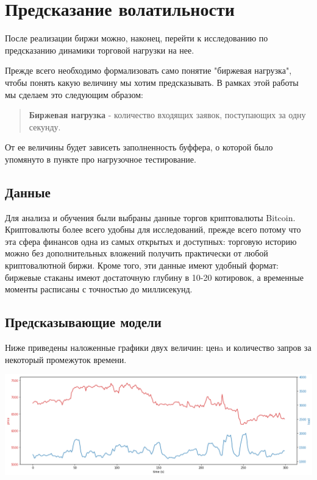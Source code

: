 \section{Предсказание волатильности}
После реализации биржи можно, наконец, перейти к исследованию по предсказанию динамики торговой нагрузки на нее.

Прежде всего необходимо формализовать само понятие "биржевая нагрузка", чтобы понять какую величину мы хотим предсказывать. В рамках этой работы мы сделаем это следующим образом:

\begin{quote}
\textbf{Биржевая нагрузка} - количество входящих заявок, поступающих за одну секунду.
\end{quote}

От ее величины будет зависеть заполненность буффера, о которой было упомянуто в пункте про нагрузочное тестирование.


\subsection{Данные}

Для анализа и обучения были выбраны данные торгов криптовалюты Bitcoin.
Криптовалюты более всего удобны для исследований, прежде всего потому что эта сфера финансов одна из самых открытых и доступных: 
торговую историю можно без дополнительных вложений получить практически от любой криптовалютной биржи. Кроме того, эти данные имеют удобный формат: биржевые стаканы имеют достаточную глубину в 10-20 котировок, а временные моменты расписаны с точностью до миллисекунд.



\subsection{Предсказывающие модели}


Ниже приведены наложенные графики двух величин: ценa и количество запров за некоторый промежуток времени.

\begin{center}
    \includegraphics[width=450pt]{images/graph_price_load.png}
\end{center}

